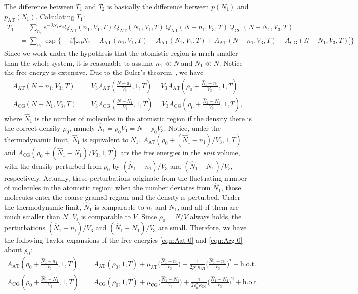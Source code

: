 \documentclass[aip,jcp,a4paper,reprint,onecolumn]{revtex4-1}
\newcommand{\AT}{{\textrm{{AT}}}}
\newcommand{\CG}{{\textrm{CG}}}
\begin{document}
The difference between $T_1$ and $T_2$ is basically the difference
between $p(N_1)$ and $p_{\AT}(N_1)$.
Calculating $T_1$:
\begin{align}\nonumber
  T_1
  &=
  \sum_{n_1}
  e^{-\beta N_1\omega_0}
  Q_{\AT}(n_1,V_1,T)\,
  Q_{\AT}(N_1,V_1,T)\,
  Q_{\AT}(N-n_1,V_3,T)\,
  Q_{\CG}(N-N_1,V_3,T) \\\label{eqn:t1-1}
  &=
  \sum_{n_1}
  \exp
  \big\{-\beta
  \big[
  \omega_0N_1 +
  A_{\AT}(n_1,V_1,T) +
  A_{\AT}(N_1,V_1,T) +
  A_{\AT}(N-n_1,V_3,T) +
  A_{\CG}(N-N_1,V_3,T)
  \big]
  \big\}
\end{align}
Since we work under the hypothesis that the atomistic region is much smaller than the whole system, it
is reasonable to assume $n_1 \ll N$ and $N_1\ll N$.
Notice the free energy is extensive.
Due to the Euler's theorem~\cite{tuckeman2010statistical},
we have
\begin{align}\label{eqn:Aat-0}
  A_{\AT}(N-n_1,V_3,T)
  &= V_3 A_{\AT}(\frac{N-n_1}{V_3},1,T)
  = V_3 A_{\AT}(\rho_0 + \frac{\hat N_1 - n_1}{V_3},1,T)\\\label{eqn:Acg-0}
  A_{\CG}(N-N_1,V_3,T)
  &= V_3 A_{\CG}(\frac{N-N_1}{V_3},1,T)
  = V_3 A_{\CG}(\rho_0 + \frac{\hat N_1 - N_1}{V_3},1,T),
\end{align}
where $\hat N_1$ is the number of molecules in the atomistic region
if the density there is the correct density $\rho_0$, namely
$\hat N_1 = \rho_0V_1 = N - \rho_0 V_3$.
Notice, under the thermodynamic limit, $\hat N_1$ is equivalent to
$\bar N_1$.
$A_{\AT}(\rho_0 + (\hat N_1 - n_1)/{V_3},1,T)$ and
$A_{\CG}(\rho_0 + (\hat N_1 - N_1)/{V_3},1,T)$ are
the free energies in the \emph{unit} volume, with
the density perturbed from $\rho_0$ by  $(\hat N_1 - n_1)/{V_3}$
and $(\hat N_1 - N_1)/{V_3}$, respectively.
Actually, these perturbations originate from the fluctuating
number of molecules in the atomistic region: when the number
deviates from $\hat N_1$, those molecules enter the coarse-grained
region, and the density is perturbed.
Under the thermodynamic
limit, $\hat N_1$ is comparable to $n_1$ and $N_1$, and all of them are
much smaller than $N$. $V_3$ is comparable to $V$.
Since $\rho_0 = N/V$ always holds, the perturbations
$(\hat N_1 - n_1)/{V_3}$
and $(\hat N_1 - N_1)/{V_3}$ are small.
Therefore, we have the following
Taylor expansions of the free energies \eqref{eqn:Aat-0} and \eqref{eqn:Acg-0}
about $\rho_0$:
\begin{align}
  A_{\AT}(\rho_0 + \frac{\hat N_1 - n_1}{V_3},1,T)
  &= A_{\AT}(\rho_0,1,T)
  +\mu_{\AT}
  \Big(
  \frac{\hat N_1 - n_1}{V_3}
  \Big)
  +
  \frac1{2\rho_0^2\,\kappa_{\AT}}
  \Big(
  \frac{\hat N_1 - n_1}{V_3}
  \Big)^2
  + \textrm{h.o.t.} \\
  A_{\CG}(\rho_0 + \frac{\hat N_1 - N_1}{V_3},1,T)
  &= A_{\CG}(\rho_0,1,T)
  +\mu_{\CG}
  \Big(
  \frac{\hat N_1 - N_1}{V_3}
  \Big)
  +
  \frac1{2\rho_0^2\,\kappa_{\CG}}
  \Big(
  \frac{\hat N_1 - N_1}{V_3}
  \Big)^2
  + \textrm{h.o.t.} 
\end{align}
\end{document}
